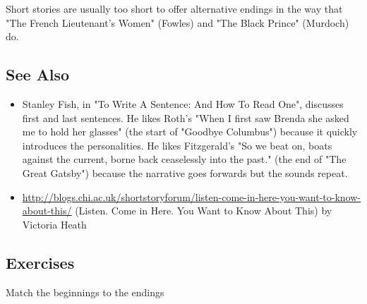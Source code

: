 \documentclass[11pt]{article}
\begin{document}
Short stories are usually too short to offer alternative endings in the way that "The French Lieutenant's Women" (Fowles) and "The Black Prince" (Murdoch) do.



\subsection*{See Also}
\begin{itemize}
\item Stanley Fish, in "To Write A Sentence: And How To Read One", discusses first and last sentences. He likes Roth's "When I first saw Brenda she asked me to hold her glasses" (the start of "Goodbye Columbus") because it quickly introduces the personalities. He likes Fitzgerald's "So we beat on, boats against the current, borne back ceaselessly into the past." (the end of "The Great Gatsby") because the narrative goes forwards but the sounds repeat.
\item \url{http://blogs.chi.ac.uk/shortstoryforum/listen-come-in-here-you-want-to-know-about-this/} (Listen. Come in Here. You Want to Know About This) by Victoria Heath
\end{itemize}

\subsection*{Exercises}
Match the beginnings to the endings
\end{document}
